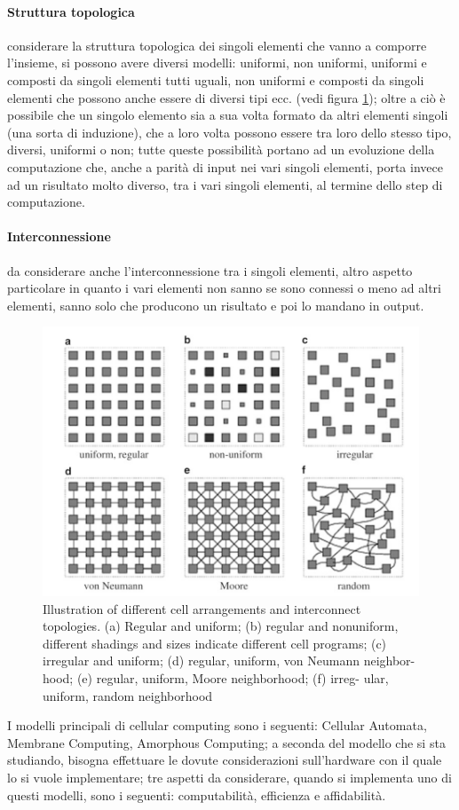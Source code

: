 \documentclass[12pt,a4paper]{report}
\begin{document}
\paragraph{Struttura topologica}
considerare la struttura topologica dei singoli elementi che vanno a comporre
l'insieme, si possono avere diversi modelli: uniformi, non uniformi, uniformi e composti da singoli elementi tutti uguali, non uniformi e composti da singoli elementi che possono anche essere di diversi tipi ecc. (vedi figura \ref{fig:cell-comp-topo}); oltre a ciò è possibile che un singolo elemento sia a sua volta formato da altri elementi singoli (una sorta di induzione), che a loro volta possono essere tra loro dello stesso tipo, diversi, uniformi o non; tutte queste possibilità portano ad un evoluzione della computazione che, anche a parità di input nei vari singoli elementi, porta invece ad un risultato molto diverso, tra i vari singoli elementi, al termine dello step di computazione.

\paragraph{Interconnessione}
da considerare anche l'interconnessione tra i singoli elementi, altro aspetto particolare in quanto i vari elementi non sanno se sono connessi o meno ad altri elementi, sanno solo che producono un risultato e poi lo mandano in output.
\begin{figure}[h]
	\centering
	\includegraphics[width=0.5\linewidth]{img/celllular computing topology}
	\caption{Illustration of different cell arrangements and interconnect topologies. (a) Regular and uniform; (b) regular and nonuniform, different shadings and sizes indicate different cell programs; (c) irregular and
uniform; (d) regular, uniform, von Neumann neighbor- hood; (e) regular, uniform, Moore neighborhood; (f) irreg- ular, uniform, random neighborhood}
	\label{fig:cell-comp-topo}
\end{figure}
I modelli principali di cellular computing sono i seguenti: Cellular Automata, Membrane Computing, Amorphous Computing; a seconda del modello che si sta studiando, bisogna effettuare le dovute considerazioni sull'hardware con il quale lo si vuole implementare; tre aspetti da considerare, quando si implementa uno di questi modelli, sono i seguenti: computabilità, efficienza e affidabilità.
\end{document}
